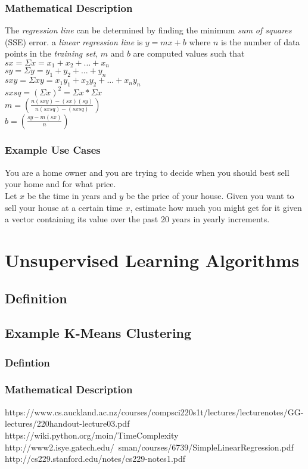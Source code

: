 \documentclass[a4paper]{article}
\begin{document}
\subsubsection{Mathematical Description}
The \textit{regression line} can be determined by finding the minimum \textit{sum of squares} (SSE) error. 
a \textit{linear regression line} is $y=mx+b$ where $n$ is the number of data points in the \textit{training set}, $m$ and $b$ are computed values such that \\ \linebreak
$sx = \Sigma x = x_1+x_2+...+x_n$\\
$sy = \Sigma y = y_1+y_2+...+y_n$\\
$sxy = \Sigma xy = x_1y_1+x_2y_2+...+x_ny_n $\\
$sxsq = \left(\Sigma x\right)^2 = \Sigma x * \Sigma x $\\
$m = \left(\frac{n(sxy)-(sx)(sy)}{n(sxsq)-(sxsq)}\right)$\\
$b = \left(\frac{sy-m(sx)}{n}\right)$
\cite{GATech}
\subsubsection{Example Use Cases}
You are a home owner and you are trying to decide when you should best sell your home and for what price.\\
Let $x$ be the time in years and $y$ be the price of your house. Given you want to sell your house at a certain time $x$, estimate how much you might get for it given a vector containing its value over the past 20 years in yearly increments. 
\section{Unsupervised Learning Algorithms}
\subsection{Definition}
\subsection{Example K-Means Clustering}
\subsubsection{Defintion}
\subsubsection{Mathematical Description}

\begin{thebibliography}{9}
https://www.cs.auckland.ac.nz/courses/compsci220s1t/lectures/lecturenotes/GG-lectures/220handout-lecture03.pdf
https://wiki.python.org/moin/TimeComplexity
http://www2.isye.gatech.edu/~sman/courses/6739/SimpleLinearRegression.pdf
http://cs229.stanford.edu/notes/cs229-notes1.pdf
\end{thebibliography}
\end{document}
